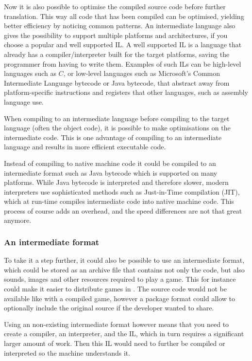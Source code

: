 

Now it is also possible to optimise the compiled source code before
further translation. This way all
code that has been compiled can be optimised, yielding better
efficiency by noticing common patterns. An intermediate language also
gives the possibility to support multiple platforms and architectures,
if you choose a popular and well supported IL. A well supported IL is a
language that already has a compiler/interpreter built for the target
platforms, saving the programmer from having to write them. Examples
of such ILs can be high-level languages such as $C$, or low-level
languages such as Microsoft's Common Intermediate Language bytecode or
Java bytecode, that abstract away from platform-specific instructions and
registers that other languages, such as assembly language use.

When compiling to an intermediate language before compiling to the target
language (often the object code), it is possible to make optimisations on the
intermediate code. This is one advantage of compiling to an intermediate
language and results in more efficient executable code.

Instead of compiling to native machine code it could be compiled to an
intermediate format such as Java bytecode which is supported on many platforms.
While Java bytecode is interpreted and therefore slower, modern interpreters
use sophisticated methods such as Just-in-Time compilation (JIT), which at
run-time compiles intermediate code into native machine code. This process of
course adds an overhead, and the speed differences are not that great
anymore. \cite{java-speed}

\subsubsection{An intermediate format}
To take it a step further, it could also be possible to use an
intermediate format, which could be stored as an archive file that
contains not only the code, but also sounds, images and other resources
required to play a game. This for instance could make it easier to
distribute games in \productname{}. The source code would not be
available like with a compiled game, however a package format could
allow to optionally include the original source if the developer wanted
to share.

Using an non-existing intermediate format however means that you need to
create a compiler, an interpreter, and the IL, which in turn requires a
significant larger amount of work. Then this IL would need to further be
compiled or interpreted so the machine understands it.

